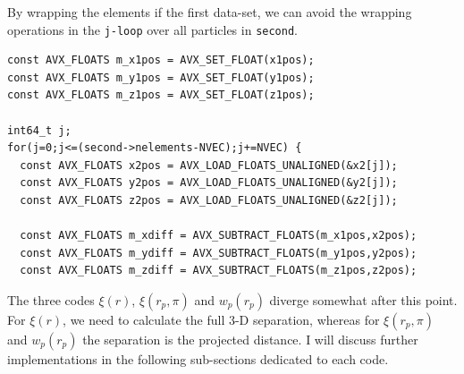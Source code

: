 \documentclass[12pt,titlepage]{article}
\newcommand{\xir}{\ensuremath{{\xi(r)}}\xspace}
\newcommand{\wprp}{\ensuremath{{w_p(r_p)}}\xspace}
\newcommand{\xirppi}{\ensuremath{{\xi(r_p,\pi)}}\xspace}
\begin{document}
By wrapping the elements if the first data-set, we can avoid the wrapping operations in the \texttt{j-loop} over all particles in \texttt{second}. 
\begin{lstlisting}[label={code:looping_over_second_particles},caption={AVX intrinsics for looping over all particles in the \texttt{second} cell. PERIODIC boundary conditions have 
already been accounted for in \texttt{x1pos,y1pos,z1pos} variables.}]
const AVX_FLOATS m_x1pos = AVX_SET_FLOAT(x1pos);
const AVX_FLOATS m_y1pos = AVX_SET_FLOAT(y1pos);
const AVX_FLOATS m_z1pos = AVX_SET_FLOAT(z1pos);

int64_t j;
for(j=0;j<=(second->nelements-NVEC);j+=NVEC) {
  const AVX_FLOATS x2pos = AVX_LOAD_FLOATS_UNALIGNED(&x2[j]);
  const AVX_FLOATS y2pos = AVX_LOAD_FLOATS_UNALIGNED(&y2[j]);
  const AVX_FLOATS z2pos = AVX_LOAD_FLOATS_UNALIGNED(&z2[j]);
  
  const AVX_FLOATS m_xdiff = AVX_SUBTRACT_FLOATS(m_x1pos,x2pos);
  const AVX_FLOATS m_ydiff = AVX_SUBTRACT_FLOATS(m_y1pos,y2pos);
  const AVX_FLOATS m_zdiff = AVX_SUBTRACT_FLOATS(m_z1pos,z2pos);
\end{lstlisting}  

The three codes \xir, \xirppi and \wprp diverge somewhat after this point. For \xir, we need to calculate the full 3-D separation, whereas for \xirppi and \wprp 
the separation is the projected distance. I will discuss further implementations in the following sub-sections dedicated to each code. 
\end{document}
